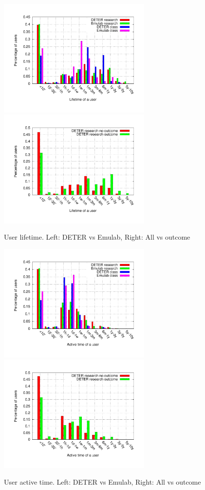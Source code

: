 \begin{figure}[htbp] \begin{center} \includegraphics[width=3in,
type=pdf,ext=.pdf,read=.pdf]{figs/user.life.gnu}
\includegraphics[width=3in,
type=pdf,ext=.pdf,read=.pdf]{figs/user.life.cmp.gnu} \caption{User
lifetime. Left: DETER vs Emulab, Right: All vs outcome} \label{userlife}
\end{center} \end{figure}


\begin{figure}[htbp] \begin{center} \includegraphics[width=3in,
type=pdf,ext=.pdf,read=.pdf]{figs/user.active.gnu}
\includegraphics[width=3in,
type=pdf,ext=.pdf,read=.pdf]{figs/user.active.cmp.gnu} \caption{User
active time. Left: DETER vs Emulab, Right: All vs outcome}
\label{useractive} \end{center} \end{figure}

